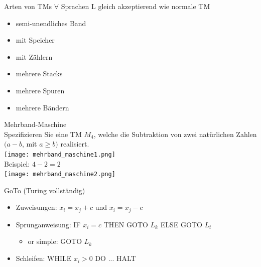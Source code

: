 \begin{concept}{Arten von TMs} $\forall$ Sprachen L gleich akzeptierend wie normale TM

    \vspace{1mm}

    \begin{minipage}{0.45\linewidth}
        \begin{itemize}
            \item semi-unendliches Band
            \item mit Speicher
            \item mit Zählern
        \end{itemize}
    \end{minipage}
    \begin{minipage}{0.45\linewidth}
        \begin{itemize}
            \item mehrere Stacks
            \item mehrere Spuren
            \item mehrere Bändern
        \end{itemize}
    \end{minipage}
\end{concept}



\begin{example2}{Mehrband-Maschine}\\
    Spezifizieren Sie eine TM $M_{4}$, welche die Subtraktion von zwei natürlichen Zahlen $(a-b$, mit $a \geq b)$ realisiert.\\
    \texttt{[image: mehrband\_maschine1.png]}\\
    Beispiel: $4-2=2$\\
    \texttt{[image: mehrband\_maschine2.png]}
\end{example2}

\begin{KR}{GoTo (Turing vollständig)}
    \begin{itemize}
        \item Zuweisungen: $x_i = x_j + c$ und $x_i = x_j - c$
        \item Sprunganweisung: IF $x_i = c$ THEN GOTO $L_k$ ELSE GOTO $L_t$
        \begin{itemize}
            \item or simple: GOTO $L_k$
        \end{itemize}
        \item Schleifen: WHILE $x_i > 0$ DO ... HALT
    \end{itemize}
\end{KR}

